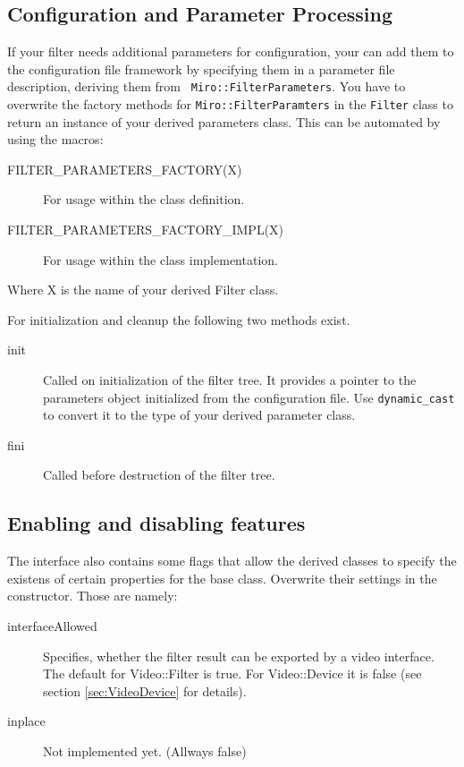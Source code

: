 \subsection{Configuration and Parameter Processing}

If your filter needs additional parameters for configuration, your can
add them to the configuration file framework by specifying them in a
parameter file description, deriving them from {\tt
  Miro::FilterParameters}. You have to overwrite the factory methods
for {\tt Miro::FilterParamters} in the {\tt Filter} class to return an
instance of your derived parameters class. This can be automated by
using the macros:
\begin{description}
\item[FILTER\_PARAMETERS\_FACTORY(X)] For usage within the class definition.
\item[FILTER\_PARAMETERS\_FACTORY\_IMPL(X)] For usage within the class implementation.
\end{description}
Where X is the name of your derived Filter class. 

For initialization and cleanup the following two methods exist.
\begin{description}
\item[init] Called on initialization of the filter tree. It provides a
  pointer to the parameters object initialized from the configuration
  file. Use {\tt dynamic\_cast} to convert it to the type of your
  derived parameter class.
\item[fini] Called before destruction of the filter tree.
\end{description}

\subsection{Enabling and disabling features}

The interface also contains some flags that allow the
derived classes to specify the existens of certain properties for the
base class. Overwrite their settings in the constructor. Those are namely:
\begin{description}
\item[interfaceAllowed] Specifies, whether the filter result can be
  exported by a video interface. The default for Video::Filter is
  true. For Video::Device it is false (see section
  \ref{sec:VideoDevice} for details).
\item[inplace] Not implemented yet. (Allways false)
\end{description}

